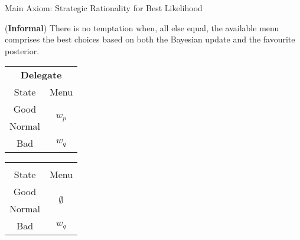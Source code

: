 \documentclass[usenames,dvipsnames,aspectratio=169,11pt, envcountsect, handout]{beamer}
\begin{document}
\begin{frame}[noframenumbering]{Main Axiom: Strategic Rationality for Best Likelihood}

	\begin{axiom}
		(\textbf{Informal}) There is no temptation when, all else equal, the available menu comprises the best choices based on both the Bayesian update and the favourite posterior. \: \: \hyperlink{srblapp}{}
	\end{axiom}

	\vfill

	\begin{table}[H]
		\centering
		\begin{minipage}{0.4\textwidth}
			\centering
			\begin{tabular}{c | c}
				\multicolumn{2}{c}{\textbf{Delegate}}                           \\
				State                & Menu                                     \\
				\hline
				{\color{blue}Good}   & \multirow{2}{*}{{\color{blue}\( w_p \)}} \\
				{\color{blue}Normal} &                                          \\
				Bad                  & \( w_q \)                                \\
			\end{tabular}
			\vspace{0.5cm} %
		\end{minipage}%
		\begin{minipage}{0.4\textwidth}
			\centering
			\begin{tabular}{c | c}
				\multicolumn{2}{c}{}                                                \\
				State                & Menu                                         \\
				\hline
				{\color{blue}Good}   & \multirow{2}{*}{{\color{blue}\(\emptyset\)}} \\
				{\color{blue}Normal} &                                              \\
				Bad                  & \( w_q \)                                    \\
			\end{tabular}
			\vspace{0.5cm} %
		\end{minipage} %
	\end{table}

\end{frame}
\end{document}
